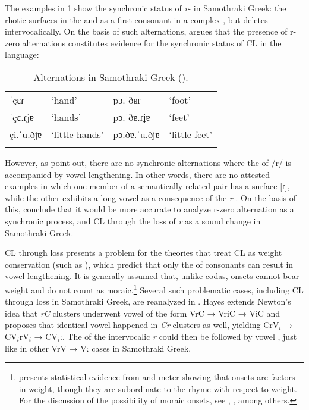 \documentclass[output=paper,
modfonts
]{LSP/langsci}
\begin{document}
The examples in \cref{tab:samgkalt} show the synchronic status of \emph{r}- in
Samothraki Greek: the rhotic surfaces in the  and as a first
consonant in a complex , but deletes intervocalically. On the basis
of such alternations, \citet{kiparsky2011k} argues that the presence of r-zero
alternations constitutes evidence for the synchronic status of CL in the
language:

\begin{table}
\caption{Alternations in Samothraki Greek (\citealt[7]{katsika2015}).}
\label{tab:samgkalt}
\begin{tabular}{llll}
	\lsptoprule
  ˈçɛɾ 	&	`hand'	&	 pɔ.ˈðɐɾ 		& `foot'\\
  ˈçɛ.ɾjɐ 	&	`hands'	&	 pɔ.ˈðɐ.ɾʝɐ 	& `feet'\\
  çi.ˈu.ðʝɐ 	&	`little hands' &	pɔ.ðɐ.ˈu.ðʝɐ 	& `little feet'\\
\lspbottomrule
 \end{tabular}
\end{table}
 
However, as \citet{katsika2015} point out, there are no
synchronic alternations where the  of /r/ is accompanied by
vowel lengthening. In other words, there are no attested examples in
which one member of a semantically related pair has a surface {[}ɾ{]},
while the other exhibits a long vowel as a consequence of the
\emph{r}-. On the basis of this, \citet{katsika2015}
conclude that it would be more accurate to analyze r-zero alternation as
a synchronic process, and CL through the loss of \emph{r} as a sound
change in Samothraki Greek.

CL through  loss presents a problem for the theories that treat CL
as weight conservation (such as \citealt{hayes1989k}), which predict that only the
 of  consonants can result in vowel lengthening. It is
generally assumed that, unlike codas, onsets cannot bear weight and do
not count as moraic.\footnote{\citet{ryan2014} presents statistical evidence
  from  and meter showing that onsets are factors in 
  weight, though they are subordinate to the rhyme with respect to
  weight. For the discussion of the possibility of moraic onsets, see
  \citet{curtis2003}, \citet{davis1999k}, among others.} Several such problematic
cases, including CL through  loss in Samothraki Greek, are
reanalyzed in \citet{hayes1989k}. Hayes extends Newton's \citeyearpar{newton1972b} idea that
\emph{rC} clusters underwent vowel  of the form VrC → VriC →
ViC and proposes that identical vowel  happened in \emph{Cr}
clusters as well, yielding CrV$_i$ → CV$_i$rV$_i$ → CV$_i$ː. The  of the
intervocalic \emph{r} could then be followed by vowel , just
like in other VrV → Vː cases in Samothraki Greek.
\end{document}
